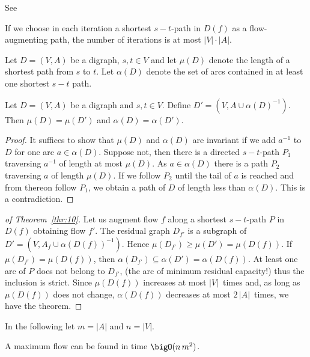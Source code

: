 See~\cite{Schrijver03}

\begin{theorem}
\label{thr:10}
If we choose in each iteration a shortest $s-t$-path in $D(f)$ as a
flow-augmenting path, the number of iterations is at most $|V| \cdot|A|$. 
  
\end{theorem}

\begin{definition}
  Let $D = (V,A)$ be a digraph, $s,t \in V$  and let  $\mu(D)$ denote the
  length of a  shortest path from $s$ to $t$. Let $\alpha(D)$ denote the set
  of arcs contained in at least one shortest $s-t$ path.
\end{definition}

\begin{theorem}
  \label{thr:11}
  Let  $D = (V,A)$ be a digraph and  $s,t \in V$. Define $D' = (V,A \cup
  \alpha(D)^{-1})$. Then $\mu(D) = \mu(D')$ and $\alpha(D) = \alpha(D')$.
\end{theorem}


\begin{proof}
  It suffices to show that $\mu(D)$ and $\alpha(D)$ are invariant if we add
  $a^{-1}$ to $D$ for one arc $a \in \alpha(D)$. Suppose not, then there is a
  directed $s-t$-path $P_1$ traversing $a^{-1}$ of length at most
  $\mu(D)$. As $a \in \alpha(D)$ there is a path $P_2$ traversing $a$ of length
  $\mu(D)$. If we follow $P_2$  until the tail of $a$ is reached  and
  from thereon follow $P_1$, we obtain a path of $D$ of length less
  than $\alpha(D)$. This is a contradiction. 
\end{proof}


\begin{proof}[of Theorem~\ref{thr:10}]
  Let us augment flow $f$ along a shortest $s-t$-path $P$ in $D(f)$
  obtaining flow $f'$. The residual graph $D_{f'}$ is a subgraph of
  $D' = (V, A_f \cup\alpha(D(f))^{-1})$. Hence $\mu(D_{f'}) \geq \mu(D')=\mu(D(f))$. If
  $\mu(D_{f'})=\mu(D(f))$, then $\alpha(D_{f'})\subseteq\alpha(D') = \alpha(D(f))$. At least one
  arc of $P$ does not belong to $D_{f'}$, (the arc of minimum residual
  capacity!) thus the inclusion is
  strict. Since $\mu(D(f))$ increases at most $|V|$~times and, as long as
  $\mu(D(f))$ does not change, $\alpha(D(f))$ decreases at most $2\, |A|$~times, we
  have the theorem.
\end{proof}

In the following let $m = |A|$ and $n = |V|$. 

\begin{corollary}
  \label{co:2}
  A maximum flow can be found in time $\bigO(n \, m^2)$.
\end{corollary}





